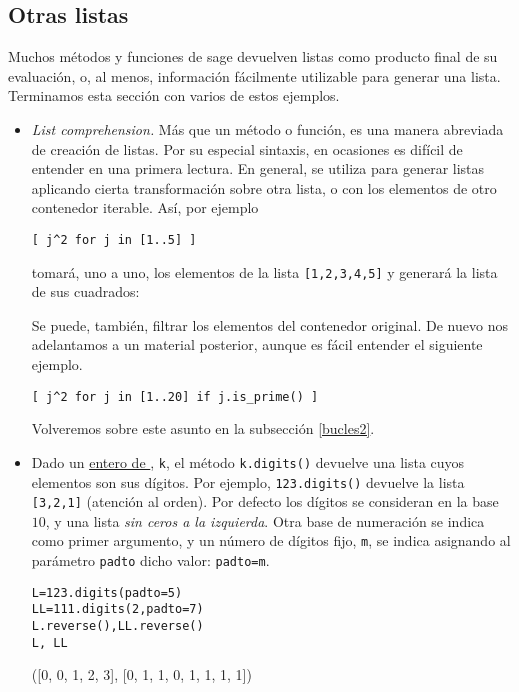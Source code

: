 \subsection{Otras listas}
Muchos métodos y funciones de sage devuelven listas como producto final de su
evaluación,
o, al menos, información fácilmente utilizable para generar una lista.
Terminamos esta
sección con varios de estos ejemplos.
\begin{itemize}
\item {\itshape List comprehension.} Más que un método o función, es una manera
abreviada
de creación de listas. Por su especial sintaxis, en ocasiones es 
difícil de entender en una primera lectura. En general, se utiliza para generar
listas
aplicando cierta transformación sobre otra lista, o con los elementos de otro
contenedor
iterable. Así, por ejemplo
\begin{lstlisting}
[ j^2 for j in [1..5] ]
\end{lstlisting}
tomará, uno a uno, los elementos de la lista \lstinline|[1,2,3,4,5]| y generará
la lista
de sus cuadrados:\\
\begin{Output}
	[1, 4, 9, 16, 25]
\end{Output}
Se puede, también, filtrar los elementos del contenedor original. De nuevo nos
adelantamos a un material posterior, aunque es fácil entender el siguiente
ejemplo.
\begin{lstlisting}
[ j^2 for j in [1..20] if j.is_prime() ]
\end{lstlisting}
\begin{Output}
	[4, 9, 25, 49, 121, 169, 289, 361]
\end{Output}

Volveremos sobre este asunto en la subsecci\'on \ref{bucles2}.
\label{ent-sage}
 \item Dado un \hyperref[enteros]{entero de {\sage}}, \lstinline|k|, el método
\lstinline|k.digits()|
devuelve
una lista cuyos elementos son sus dígitos. Por ejemplo, \lstinline|123.digits()|
devuelve
la lista  \lstinline|[3,2,1]| (atención al orden). Por defecto los dígitos se
consideran
en la base $10$, y una lista \emph{sin ceros a la izquierda}. Otra base de
numeración se
indica como primer argumento, y un número de dígitos fijo, \lstinline|m|, se
indica
asignando al parámetro \lstinline|padto| dicho valor: \lstinline|padto=m|.
\begin{lstlisting}
L=123.digits(padto=5)
LL=111.digits(2,padto=7)
L.reverse(),LL.reverse()
L, LL
\end{lstlisting}
\begin{Output}
	([0, 0, 1, 2, 3], [0, 1, 1, 0, 1, 1, 1, 1])
\end{Output}


\end{itemize}
